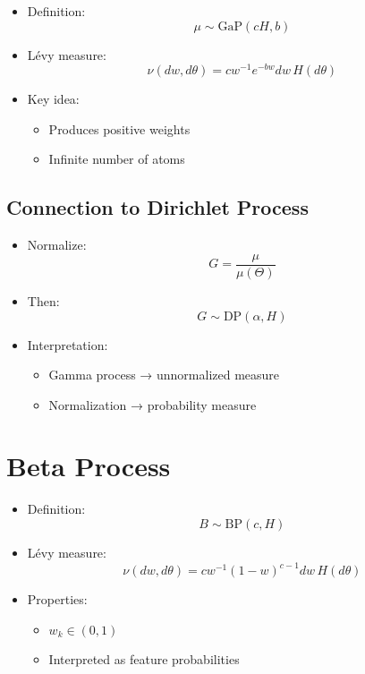 \documentclass[12pt,oneside]{book}
\numberwithin{equation}{section}
\theoremstyle{definition}
\theoremstyle{plain}
\theoremstyle{remark}
\begin{document}
\begin{itemize}
\item Definition:
\[
\mu \sim \text{GaP}(cH, b)
\]

\item Lévy measure:
\[
\nu(dw, d\theta) = c w^{-1} e^{-bw} dw \, H(d\theta)
\]

\item Key idea:
\begin{itemize}
\item Produces positive weights
\item Infinite number of atoms
\end{itemize}
\end{itemize}

\subsection{Connection to Dirichlet Process}

\begin{itemize}
\item Normalize:
\[
G = \frac{\mu}{\mu(\Theta)}
\]

\item Then:
\[
G \sim \text{DP}(\alpha, H)
\]

\item Interpretation:
\begin{itemize}
\item Gamma process → unnormalized measure
\item Normalization → probability measure
\end{itemize}
\end{itemize}

\section{Beta Process}

\begin{itemize}
\item Definition:
\[
B \sim \text{BP}(c, H)
\]

\item Lévy measure:
\[
\nu(dw, d\theta) = c w^{-1}(1-w)^{c-1} dw \, H(d\theta)
\]

\item Properties:
\begin{itemize}
\item $w_k \in (0,1)$
\item Interpreted as feature probabilities
\end{itemize}
\end{itemize}
\end{document}
